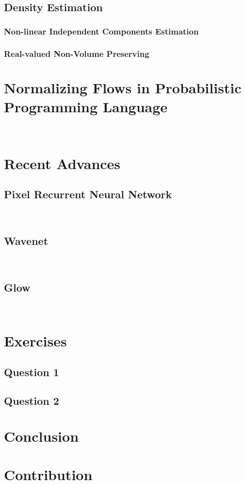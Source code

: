\documentclass[runningheads]{llncs}
\begin{document}
\subsection{Density Estimation}

\subsubsection{Non-linear Independent Components Estimation}
\subsubsection{Real-valued Non-Volume Preserving}

\section{Normalizing Flows in Probabilistic Programming Language}
~\cite{dillon2017tensorflow}

\section{Recent Advances}
\subsection{Pixel Recurrent Neural Network}
~\cite{oord2016pixel}
\subsection{Wavenet}
~\cite{van2016wavenet}
\subsection{Glow}
~\cite{kingma2018glow}



\section{Exercises}
\subsection{Question 1}

\subsection{Question 2}



\section{Conclusion}


\section{Contribution}

%
%
%
% 
% 
%

 
\end{document}
